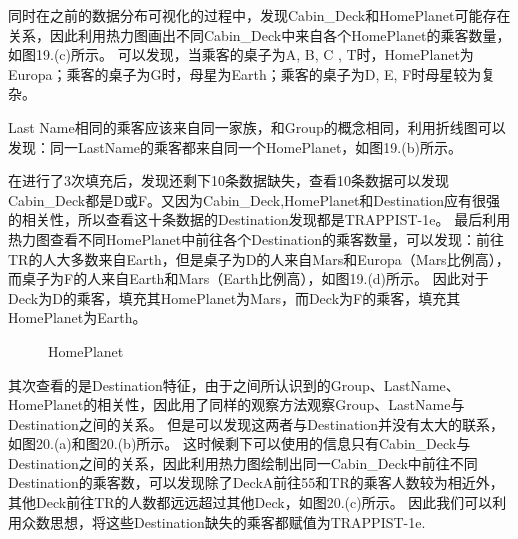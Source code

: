 \documentclass[../main.tex]{subfiles}
\begin{document}
            同时在之前的数据分布可视化的过程中，发现Cabin\_Deck和HomePlanet可能存在关系，因此利用热力图画出不同Cabin\_Deck中来自各个HomePlanet的乘客数量，如图19.(c)所示。
            可以发现，当乘客的桌子为A, B, C , T时，HomePlanet为Europa；乘客的桌子为G时，母星为Earth；乘客的桌子为D, E, F时母星较为复杂。

            Last Name相同的乘客应该来自同一家族，和Group的概念相同，利用折线图可以发现：同一LastName的乘客都来自同一个HomePlanet，如图19.(b)所示。

            在进行了3次填充后，发现还剩下10条数据缺失，查看10条数据可以发现Cabin\_Deck都是D或F。又因为Cabin\_Deck,HomePlanet和Destination应有很强的相关性，所以查看这十条数据的Destination发现都是TRAPPIST-1e。
            最后利用热力图查看不同HomePlanet中前往各个Destination的乘客数量，可以发现：前往TR的人大多数来自Earth，但是桌子为D的人来自Mars和Europa（Mars比例高），而桌子为F的人来自Earth和Mars（Earth比例高），如图19.(d)所示。
            因此对于Deck为D的乘客，填充其HomePlanet为Mars，而Deck为F的乘客，填充其HomePlanet为Earth。

            \begin{figure}[H]
                \centering
                
                \caption{HomePlanet}
            \end{figure}

            其次查看的是Destination特征，由于之间所认识到的Group、LastName、HomePlanet的相关性，因此用了同样的观察方法观察Group、LastName与Destination之间的关系。
            但是可以发现这两者与Destination并没有太大的联系，如图20.(a)和图20.(b)所示。
            这时候剩下可以使用的信息只有Cabin\_Deck与Destination之间的关系，因此利用热力图绘制出同一Cabin\_Deck中前往不同Destination的乘客数，可以发现除了DeckA前往55和TR的乘客人数较为相近外，其他Deck前往TR的人数都远远超过其他Deck，如图20.(c)所示。
            因此我们可以利用众数思想，将这些Destination缺失的乘客都赋值为TRAPPIST-1e.
\end{document}
